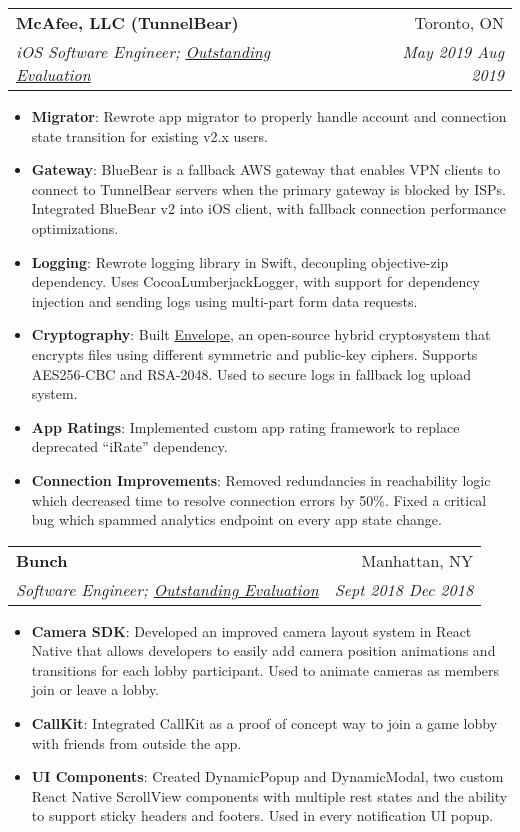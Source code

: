\documentclass{article}
\makeatletter
\newcommand{\resumeItem}[2]{
  \item\small{
    \textbf{#1}{: #2\vspace{-2pt}}
  }
}
\newcommand{\resumeSubheading}[4]{
  \vspace{-1pt}\item
    \begin{tabular*}{0.97\textwidth}[t]{l@{\extracolsep{\fill}}r}
      \textbf{#1}&#2 \\
      \textit{\small#3}&\textit{\small#4} \\
    \end{tabular*}\vspace{-4pt}
}
\newcommand{\resumeItemListStart}{\begin{itemize}}
\newcommand{\resumeItemListEnd}{\end{itemize}\vspace{-4pt}}
\makeatother
\begin{document}
    \resumeSubheading{McAfee, LLC (TunnelBear)}{Toronto, ON}{iOS Software Engineer; \href{https://george-lim.github.io/evaluations/evaluation-3a.pdf}{Outstanding Evaluation}}{May 2019 \textendash{} Aug 2019}
      \resumeItemListStart{}
        \resumeItem{Migrator}
          {Rewrote app migrator to properly handle account and connection state transition for existing v2.x users.}
        \resumeItem{Gateway}
          {BlueBear is a fallback AWS gateway that enables VPN clients to connect to TunnelBear servers when the primary gateway is blocked by ISPs. Integrated BlueBear v2 into iOS client, with fallback connection performance optimizations.}
        \resumeItem{Logging}
          {Rewrote logging library in Swift, decoupling objective-zip dependency. Uses CocoaLumberjackLogger, with support for dependency injection and sending logs using multi-part form data requests.}
        \resumeItem{Cryptography}
          {Built \href{https://github.com/george-lim/envelope}{Envelope}, an open-source hybrid cryptosystem that encrypts files using different symmetric and public-key ciphers. Supports AES256-CBC and RSA-2048. Used to secure logs in fallback log upload system.}
        \resumeItem{App Ratings}
          {Implemented custom app rating framework to replace deprecated ``iRate'' dependency.}
        \resumeItem{Connection Improvements}
          {Removed redundancies in reachability logic which decreased time to resolve connection errors by 50\%. Fixed a critical bug which spammed analytics endpoint on every app state change.}
      \resumeItemListEnd{}

    \resumeSubheading{Bunch}{Manhattan, NY}{Software Engineer; \href{https://george-lim.github.io/evaluations/evaluation-2b.pdf}{Outstanding Evaluation}}{Sept 2018 \textendash{} Dec 2018}
      \resumeItemListStart{}
        \resumeItem{Camera SDK}
          {Developed an improved camera layout system in React Native that allows developers to easily add camera position animations and transitions for each lobby participant. Used to animate cameras as members join or leave a lobby.}
        \resumeItem{CallKit}
          {Integrated CallKit as a proof of concept way to join a game lobby with friends from outside the app.}
        \resumeItem{UI Components}
          {Created DynamicPopup and DynamicModal, two custom React Native ScrollView components with multiple rest states and the ability to support sticky headers and footers. Used in every notification UI popup.}
      \resumeItemListEnd{}
\end{document}
